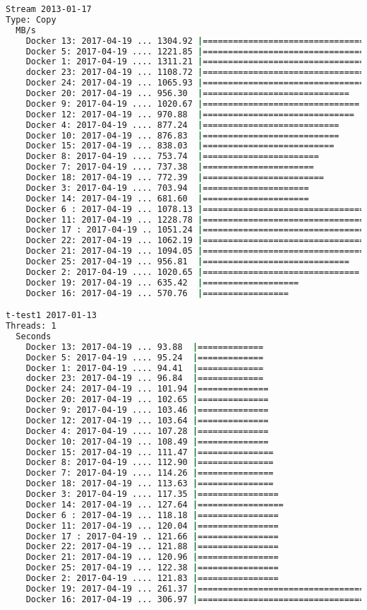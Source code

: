 \documentclass[french]{article}
\begin{document}
\begin{lstlisting}[language=bash,caption={}]
Stream 2013-01-17
Type: Copy
  MB/s
    Docker 13: 2017-04-19 ... 1304.92 |========================================
    Docker 5: 2017-04-19 .... 1221.85 |=====================================
    Docker 1: 2017-04-19 .... 1311.21 |========================================
    docker 23: 2017-04-19 ... 1108.72 |==================================
    Docker 24: 2017-04-19 ... 1065.93 |=================================
    Docker 20: 2017-04-19 ... 956.30  |=============================
    Docker 9: 2017-04-19 .... 1020.67 |===============================
    Docker 12: 2017-04-19 ... 970.88  |==============================
    Docker 4: 2017-04-19 .... 877.24  |===========================
    Docker 10: 2017-04-19 ... 876.83  |===========================
    Docker 15: 2017-04-19 ... 838.03  |==========================
    Docker 8: 2017-04-19 .... 753.74  |=======================
    Docker 7: 2017-04-19 .... 737.38  |======================
    Docker 18: 2017-04-19 ... 772.39  |========================
    Docker 3: 2017-04-19 .... 703.94  |=====================
    Docker 14: 2017-04-19 ... 681.60  |=====================
    Docker 6 : 2017-04-19 ... 1078.13 |=================================
    Docker 11: 2017-04-19 ... 1228.78 |=====================================
    Docker 17 : 2017-04-19 .. 1051.24 |================================
    Docker 22: 2017-04-19 ... 1062.19 |================================
    Docker 21: 2017-04-19 ... 1094.05 |=================================
    Docker 25: 2017-04-19 ... 956.81  |=============================
    Docker 2: 2017-04-19 .... 1020.65 |===============================
    Docker 19: 2017-04-19 ... 635.42  |===================
    Docker 16: 2017-04-19 ... 570.76  |=================

t-test1 2017-01-13
Threads: 1
  Seconds
    Docker 13: 2017-04-19 ... 93.88  |=============
    Docker 5: 2017-04-19 .... 95.24  |=============
    Docker 1: 2017-04-19 .... 94.41  |=============
    docker 23: 2017-04-19 ... 96.84  |=============
    Docker 24: 2017-04-19 ... 101.94 |==============
    Docker 20: 2017-04-19 ... 102.65 |==============
    Docker 9: 2017-04-19 .... 103.46 |==============
    Docker 12: 2017-04-19 ... 103.64 |==============
    Docker 4: 2017-04-19 .... 107.28 |==============
    Docker 10: 2017-04-19 ... 108.49 |==============
    Docker 15: 2017-04-19 ... 111.47 |===============
    Docker 8: 2017-04-19 .... 112.90 |===============
    Docker 7: 2017-04-19 .... 114.26 |===============
    Docker 18: 2017-04-19 ... 113.63 |===============
    Docker 3: 2017-04-19 .... 117.35 |================
    Docker 14: 2017-04-19 ... 127.64 |=================
    Docker 6 : 2017-04-19 ... 118.18 |================
    Docker 11: 2017-04-19 ... 120.04 |================
    Docker 17 : 2017-04-19 .. 121.66 |================
    Docker 22: 2017-04-19 ... 121.88 |================
    Docker 21: 2017-04-19 ... 120.96 |================
    Docker 25: 2017-04-19 ... 122.38 |================
    Docker 2: 2017-04-19 .... 121.83 |================
    Docker 19: 2017-04-19 ... 261.37 |===================================
    Docker 16: 2017-04-19 ... 306.97 |=========================================



\end{lstlisting}
\end{document}
